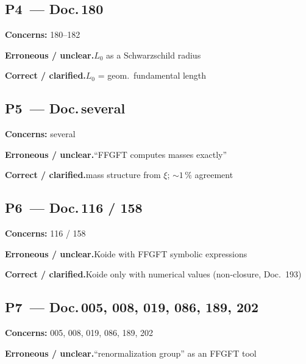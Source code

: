 \medskip


\subsection*{P4~--- Doc.\,180}

\noindent\textbf{Concerns:} 180--182


\smallskip\noindent\textbf{Erroneous / unclear.}\quad $L_0$ as a Schwarzschild radius


\smallskip\noindent\textbf{Correct / clarified.}\quad $L_0$ = geom.\ fundamental length


\medskip


\subsection*{P5~--- Doc.\,several}

\noindent\textbf{Concerns:} several


\smallskip\noindent\textbf{Erroneous / unclear.}\quad \enquote{FFGFT computes masses exactly}


\smallskip\noindent\textbf{Correct / clarified.}\quad mass structure from $\xi$; $\sim 1\,\%$ agreement


\medskip


\subsection*{P6~--- Doc.\,116 / 158}

\noindent\textbf{Concerns:} 116 / 158


\smallskip\noindent\textbf{Erroneous / unclear.}\quad Koide with FFGFT symbolic expressions


\smallskip\noindent\textbf{Correct / clarified.}\quad Koide only with numerical values (non-closure, Doc.~193)


\medskip


\subsection*{P7~--- Doc.\,005, 008, 019, 086, 189, 202}

\noindent\textbf{Concerns:} 005, 008, 019, 086, 189, 202


\smallskip\noindent\textbf{Erroneous / unclear.}\quad \enquote{renormalization group} as an FFGFT tool


